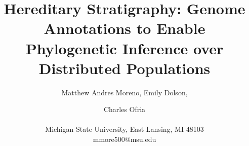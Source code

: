 \title{ Hereditary Stratigraphy: Genome Annotations to Enable Phylogenetic Inference over Distributed Populations }

\author{Matthew Andres Moreno, Emily Dolson, \and Charles Ofria \\
\mbox{}\\
Michigan State University, East Lansing, MI 48103 \\
mmore500@msu.edu}

\maketitle
